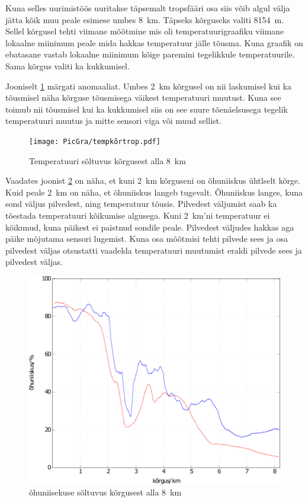 \documentclass{trkut}%
\begin{document}
Kuna selles uurimistöös uuritakse täpsemalt tropsfääri osa siis võib algul välja jätta kõik muu peale esimese umbes \SI{8}{km}. Täpseks kõrguseks valiti \SI{8154}{m}. Sellel kõrgusel tehti viimane mõõtmine mis oli temperatuurigraafiku viimane lokaalne miinimum peale mida hakkas temperatuur jälle tõusma. Kuna graafik on ebatasane vastab lokaalne miinimum kõige paremini tegelikkule temperatuurile. Sama kõrgus valiti ka kukkumisel.

Jooniselt \ref{tempkõrtrop} märgati anomaaliat. Umbes \SI{2}{km} kõrgusel on nii laskumisel kui ka tõusmisel näha kõrguse tõusmisega väikest temperatuuri muutust. Kuna see toimub nii tõusmisel kui ka kukkumisel siis on see suure tõenäelsusega tegelik temperatuuri muutus ja mitte sensori viga või muud sellist.
\begin{figure}[h]
	\texttt{[image: PicGra/tempkõrtrop.pdf]}
	\caption{Temperatuuri sõltuvus kõrgusest alla \SI{8}{km}}
	\label{tempkõrtrop}%
\end{figure}

Vaadates joonist \ref{humkõrtrop} on näha, et kuni \SI{2}{km} kõrguseni on õhuniiskus ühtlselt kõrge. Kuid peale \SI{2}{km} on näha, et õhuniiskus langeb tugevalt. Õhuniiskus langes, kuna sond väljus pilvedest, ning temperatuur tõusis. Pilvedest väljumist saab ka tõestada temperatuuri kõikumise algusega. Kuni \SI{2}{km}'ni temperatuur ei kõikunud, kuna päikest ei paistnud sondile peale. Pilvedest väljudes hakkas aga päike mõjutama sensori lugemist. Kuna osa mõõtmisi tehti pilvede sees ja osa pilvedest väljas otsustatti vaadelda temperatuuri muutumist eraldi pilvede sees ja pilvedest väljas.
\begin{figure}[h]
	\includegraphics[width=1\textwidth]{PicGra/humkõrtrop.pdf}
	\caption{õhuniisekuse sõltuvus kõrgusest alla \SI{8}{km}}
	\label{humkõrtrop}%
\end{figure}
\end{document}
